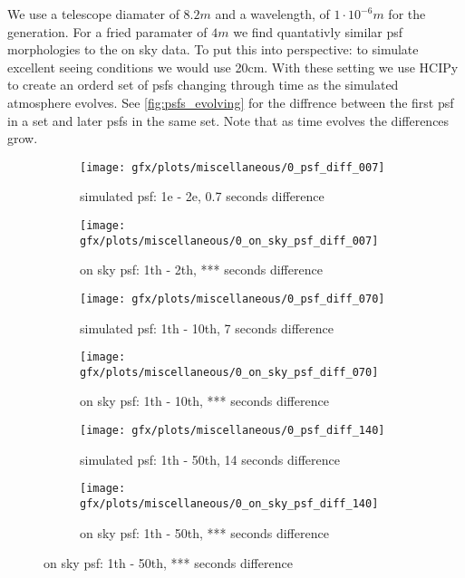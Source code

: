 We use a telescope diamater of $8.2m$ and a wavelength, of $1\cdot 10^{-6}m$ for the generation. For a fried paramater of $4m$ we find quantativly similar psf morphologies to the on sky data. To put this into perspective: to simulate excellent seeing conditions we would use 20cm. With these setting we use \ac{HCIPy} to create an orderd set of psfs changing through time as the simulated atmosphere evolves. See \autoref{fig:psfs_evolving} for the diffrence between the first psf in a set and later psfs in the same set. Note that as time evolves the differences grow. 

\begin{figure}[h!]
  
      \begin{subfigure}[b]{0.5\textwidth}
        \texttt{[image: gfx/plots/miscellaneous/0\_psf\_diff\_007]}
        \caption{simulated psf: 1e - 2e, 0.7 seconds difference}
      \end{subfigure}%
      \begin{subfigure}[b]{0.5\textwidth}
        \texttt{[image: gfx/plots/miscellaneous/0\_on\_sky\_psf\_diff\_007]}
        \caption{on sky psf: 1th - 2th, *** seconds difference}
      \end{subfigure}      
      
      \begin{subfigure}[b]{0.5\textwidth}
        \texttt{[image: gfx/plots/miscellaneous/0\_psf\_diff\_070]}
        \caption{simulated psf: 1th - 10th, 7 seconds difference}
      \end{subfigure}%
      \begin{subfigure}[b]{0.5\textwidth}
        \texttt{[image: gfx/plots/miscellaneous/0\_on\_sky\_psf\_diff\_070]}
        \caption{on sky psf: 1th - 10th, *** seconds difference}
      \end{subfigure}
            
      \begin{subfigure}[b]{0.5\textwidth}
        \texttt{[image: gfx/plots/miscellaneous/0\_psf\_diff\_140]}
        \caption{simulated psf: 1th - 50th, 14 seconds difference}
      \end{subfigure}%
      \begin{subfigure}[b]{0.5\textwidth}
        \texttt{[image: gfx/plots/miscellaneous/0\_on\_sky\_psf\_diff\_140]}
        \caption{on sky psf: 1th - 50th, *** seconds difference}
      \end{subfigure}


\end{figure}
